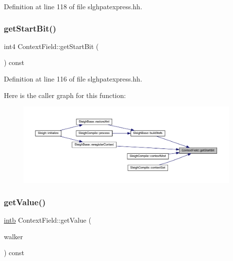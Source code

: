Definition at line 118 of file slghpatexpress.\+hh.

\mbox{\label{class_context_field_a5aebf2f7b5e60f99a2fac433d8b92ac4}} 
\subsubsection{\texorpdfstring{getStartBit()}{getStartBit()}}
{\footnotesize\ttfamily int4 Context\+Field\+::get\+Start\+Bit (\begin{DoxyParamCaption}\item[{void}]{ }\end{DoxyParamCaption}) const\hspace{0.3cm}{\ttfamily [inline]}}



Definition at line 116 of file slghpatexpress.\+hh.

Here is the caller graph for this function\+:
\nopagebreak
\begin{figure}[H]
\begin{center}
\leavevmode
\includegraphics[width=350pt]{class_context_field_a5aebf2f7b5e60f99a2fac433d8b92ac4_icgraph}
\end{center}
\end{figure}
\mbox{\label{class_context_field_aec7ed9eac68940e815b6f9cc9c5d2492}} 
\subsubsection{\texorpdfstring{getValue()}{getValue()}}
{\footnotesize\ttfamily \mbox{\hyperlink{types_8h_aa925ba3e627c2df89d5b1cfe84fb8572}{intb}} Context\+Field\+::get\+Value (\begin{DoxyParamCaption}\item[{\mbox{\hyperlink{class_parser_walker}{Parser\+Walker}} \&}]{walker }\end{DoxyParamCaption}) const\hspace{0.3cm}{\ttfamily [virtual]}}



